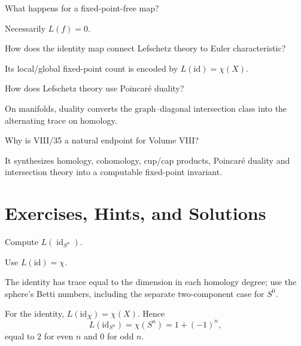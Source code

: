 \begin{problem}
What happens for a fixed-point-free map?
\end{problem}
\begin{solution}
Necessarily $L(f)=0$.
\end{solution}

\begin{problem}
How does the identity map connect Lefschetz theory to Euler characteristic?
\end{problem}
\begin{solution}
Its local/global fixed-point count is encoded by $L(\mathrm{id})=\chi(X)$.
\end{solution}

\begin{problem}
How does Lefschetz theory use Poincaré duality?
\end{problem}
\begin{solution}
On manifolds, duality converts the graph--diagonal intersection class into the alternating trace on homology.
\end{solution}

\begin{problem}
Why is VIII/35 a natural endpoint for Volume VIII?
\end{problem}
\begin{solution}
It synthesizes homology, cohomology, cup/cap products, Poincaré duality and intersection theory into a computable fixed-point invariant.
\end{solution}

\section{Exercises, Hints, and Solutions}
\begin{exercise}\label{exr:viii35-01}
Compute $L(\operatorname{id}_{S^n})$.
\end{exercise}
\begin{hint}
Use $L(\mathrm{id})=\chi$.

The identity has trace equal to the dimension in each homology degree; use the sphere's Betti numbers, including the separate two-component case for \(S^0\).
\end{hint}
\begin{solution}
For the identity, \(L(\mathrm{id}_X)=\chi(X)\). Hence
\[
L(\mathrm{id}_{S^n})=\chi(S^n)=1+(-1)^n,
\]
equal to \(2\) for even \(n\) and \(0\) for odd \(n\).
\end{solution}

